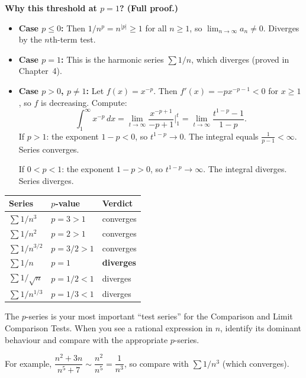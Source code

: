\noindent
\textbf{Why this threshold at $p=1$? (Full proof.)}
\begin{itemize}[leftmargin=*]
\item \textbf{Case $p\le 0$:} Then $1/n^p=n^{|p|}\ge 1$ for all $n\ge 1$, so $\lim_{n\to\infty}a_n\ne 0$. Diverges by the $n$th-term test.
\item \textbf{Case $p=1$:} This is the harmonic series $\sum 1/n$, which diverges (proved in Chapter~4).
\item \textbf{Case $p>0$, $p\ne 1$:} Let $f(x)=x^{-p}$. Then $f'(x)=-px^{-p-1}<0$ for $x\ge 1$, so $f$ is decreasing. Compute:
\[
\int_1^{\infty}x^{-p}\,dx
=\lim_{t\to\infty}\frac{x^{-p+1}}{-p+1}\bigg|_1^{t}
=\lim_{t\to\infty}\frac{t^{1-p}-1}{1-p}.
\]
If $p>1$: the exponent $1-p<0$, so $t^{1-p}\to 0$. The integral equals $\frac{1}{p-1}<\infty$. Series converges.

If $0<p<1$: the exponent $1-p>0$, so $t^{1-p}\to\infty$. The integral diverges. Series diverges.
\end{itemize}

\begin{keyformula}[title={$p$-series reference table (memorise for exams)}]
\begin{center}
\renewcommand{\arraystretch}{1.3}
\begin{tabular}{l@{\hskip 2em}l@{\hskip 2em}l}
\textbf{Series} & \textbf{$p$-value} & \textbf{Verdict} \\
\hline
$\sum 1/n^3$ & $p=3>1$ & converges \\
$\sum 1/n^2$ & $p=2>1$ & converges \\
$\sum 1/n^{3/2}$ & $p=3/2>1$ & converges \\
$\sum 1/n$ & $p=1$ & \textbf{diverges} \\
$\sum 1/\sqrt{n}$ & $p=1/2<1$ & diverges \\
$\sum 1/n^{1/3}$ & $p=1/3<1$ & diverges \\
\end{tabular}
\end{center}
\end{keyformula}

\begin{examtip}
The $p$-series is your most important ``test series'' for the Comparison and Limit Comparison Tests.
When you see a rational expression in $n$, identify its dominant behaviour and compare with the appropriate $p$-series.

For example, $\dfrac{n^2+3n}{n^5+7}\sim \dfrac{n^2}{n^5}=\dfrac{1}{n^3}$, so compare with $\sum 1/n^3$ (which converges).
\end{examtip}

